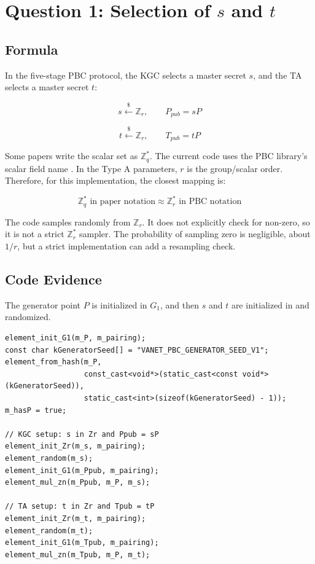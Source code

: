 \documentclass[11pt,a4paper]{article}
\newcommand{\codepath}[1]{\path{#1}}
\begin{document}
\section{Question 1: Selection of \texorpdfstring{\(s\)}{s} and \texorpdfstring{\(t\)}{t}}

\subsection{Formula}

In the five-stage PBC protocol, the KGC selects a master secret \(s\), and the TA
selects a master secret \(t\):

\[
  s \xleftarrow{\$} \mathbb{Z}_r, \qquad P_{pub}=sP
\]

\[
  t \xleftarrow{\$} \mathbb{Z}_r, \qquad T_{pub}=tP
\]

Some papers write the scalar set as \(\mathbb{Z}_q^*\). The current code uses the
PBC library's scalar field name \codepath{Zr}. In the Type A parameters, \(r\) is
the group/scalar order. Therefore, for this implementation, the closest mapping
is:

\[
  \mathbb{Z}_q^*\text{ in paper notation} \approx \mathbb{Z}_r^*\text{ in PBC notation}
\]

The code samples randomly from \(\mathbb{Z}_r\). It does not explicitly check for
non-zero, so it is not a strict \(\mathbb{Z}_r^*\) sampler. The probability of
sampling zero is negligible, about \(1/r\), but a strict implementation can add a
resampling check.

\subsection{Code Evidence}

The generator point \(P\) is initialized in \(G_1\), and then \(s\) and \(t\) are
initialized in \codepath{Zr} and randomized.

\begin{lstlisting}[style=cppstyle,caption={Setup code for P, s, Ppub, t, and Tpub.}]
element_init_G1(m_P, m_pairing);
const char kGeneratorSeed[] = "VANET_PBC_GENERATOR_SEED_V1";
element_from_hash(m_P,
                  const_cast<void*>(static_cast<const void*>(kGeneratorSeed)),
                  static_cast<int>(sizeof(kGeneratorSeed) - 1));
m_hasP = true;

// KGC setup: s in Zr and Ppub = sP
element_init_Zr(m_s, m_pairing);
element_random(m_s);
element_init_G1(m_Ppub, m_pairing);
element_mul_zn(m_Ppub, m_P, m_s);

// TA setup: t in Zr and Tpub = tP
element_init_Zr(m_t, m_pairing);
element_random(m_t);
element_init_G1(m_Tpub, m_pairing);
element_mul_zn(m_Tpub, m_P, m_t);
\end{lstlisting}
\end{document}

